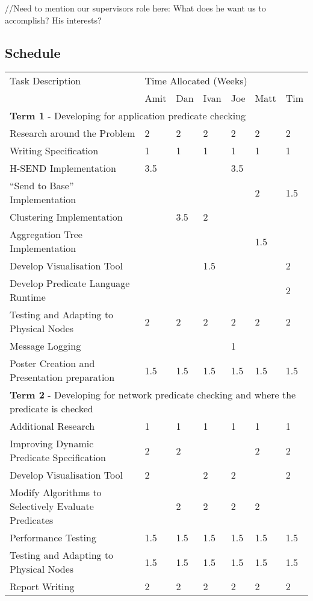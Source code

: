 //Need to mention our supervisors role here: What does he want us to accomplish? His interests?

\subsection{Schedule}


\begin{table}[H]
	\centering
	\begin{tabular}{| l | l | l | l | l | l | l |}
	\hline
	Task Description & \multicolumn{6}{l|}{Time Allocated (Weeks)}\\
	~ & Amit & Dan & Ivan & Joe & Matt & Tim \\
	\hline
	\hline
	\multicolumn{7}{|l|}{\textbf{Term 1} - Developing for application predicate checking} \\
	\hline


	Research around the Problem & 2 & 2 & 2 & 2 & 2 & 2\\
	Writing Specification & 1 & 1 & 1 & 1 & 1 & 1\\
	H-SEND Implementation & 3.5 & ~ & ~ & 3.5 & ~ & ~\\
	``Send to Base'' Implementation & ~ & ~ & ~ & ~ & 2 & 1.5\\
	Clustering Implementation & ~ & 3.5 & 2 & ~ & ~ & ~\\
	Aggregation Tree Implementation & ~ & ~ & ~ & ~ & 1.5 & ~\\
	Develop Visualisation Tool & ~ & ~ & 1.5 & ~ & ~ & 2\\
	Develop Predicate Language Runtime & ~ & ~ & ~ & ~ & ~ & 2\\
	Testing and Adapting to Physical Nodes & 2 & 2 & 2 & 2 & 2 & 2\\
	Message Logging & ~ & ~ & ~ & 1 & ~ & ~\\
	Poster Creation and Presentation preparation & 1.5 & 1.5 & 1.5 & 1.5 & 1.5 & 1.5\\

	\hline
	\hline
	\multicolumn{7}{|l|}{\textbf{Term 2} - Developing for network predicate checking and where the predicate is checked} \\
	\hline
	
	Additional Research & 1 & 1 & 1 & 1 & 1 & 1\\
	Improving Dynamic Predicate Specification & 2 & 2 & ~ & ~ & 2 & 2\\
	Develop Visualisation Tool & 2 & ~ & 2 & 2 & ~ & 2\\
	Modify Algorithms to Selectively Evaluate Predicates & ~ & 2 & 2 & 2 & 2 & ~\\
	Performance Testing & 1.5 & 1.5 & 1.5 & 1.5 & 1.5 & 1.5\\
	Testing and Adapting to Physical Nodes & 1.5 & 1.5 & 1.5 & 1.5 & 1.5 & 1.5\\
	Report Writing & 2 & 2 & 2 & 2 & 2 & 2\\
	
	\hline
	
	\end{tabular}
\end{table}

